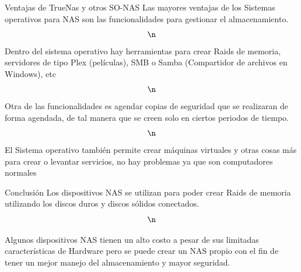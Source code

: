 \documentclass[presentation]{beamer}
\begin{document}
\begin{frame}[label={sec:org2ce9c9c}]{Ventajas de TrueNas y otros SO-NAS}
Las mayores ventajas de los Sistemas operativos para NAS son las funcionalidades para gestionar el almacenamiento.$$\n$$
Dentro del sistema operativo hay herramientas para crear Raids de memoria, servidores de tipo Plex (películas), SMB o Samba (Compartidor de archivos en Windows), etc$$\n$$
Otra de las funcionalidades es agendar copias de seguridad que se realizaran de forma agendada, de tal manera que se creen solo en ciertos periodos de tiempo.$$\n$$
El Sistema operativo también permite crear máquinas virtuales y otras cosas más para crear o levantar servicios, no hay problemas ya que son computadores normales
\end{frame}

\begin{frame}[label={sec:orgb8ef0b7}]{Conclusión}
Los dispositivos NAS se utilizan para poder crear Raids de memoria utilizando los discos duros y discos sólidos conectados.$${\n}$$

Algunos dispositivos NAS tienen un alto costo a pesar de sus limitadas características de Hardware pero se puede crear un NAS propio con el fin de tener un mejor manejo del almacenamiento y mayor seguridad.
\end{frame}
\end{document}
